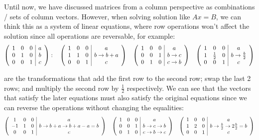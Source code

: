 \documentclass[11pt, cyan, night, 1in]{LatexTemplate/hw}
\begin{document}
Until now, we have discussed matrices from a column perspective as combinations / sets of column vectors. However, when solving solution like $Ax=B$, we can think this as a system of linear equations, where row operations won't affect the solution since all operations are reversable, for example: \[
    \left(\begin{array}{ccc|c}
        1 & 0 & 0  & a\\
        0 & 1 & 0  & b\\
        0 & 0 & 1 & c
    \end{array}\right):\quad\left(\begin{array}{ccc|c}
        1 & 0 & 0  & a\\
        1 & 1 & 0  & b \rightarrow b + a\\
        0 & 0 & 1 & c
    \end{array}\right) \quad \left(\begin{array}{ccc|c}
        1 & 0 & 0  & a\\
        0 & 0 & 1  & b \rightarrow c\\
        0 & 1 & 0 & c \rightarrow b
    \end{array}\right) \quad \left(\begin{array}{ccc|c}
        1 & 0 & 0  & a\\
        1 & \frac12 & 0  & b \rightarrow \frac{b}{2}\\
        0 & 0 & 1 & c
    \end{array}\right) 
    \]

are the transformations that add the first row to the second row; swap the last 2 rows; and multiply the second row by $\frac12$ respectively. We can see that the vectors that satisfy the later equations must also satisfy the original equations since we can reverse the operations without changing the equalities:\[
    \left(\begin{array}{ccc|c}
        1 & 0 & 0  & a\\
        -1 & 1 & 0  & b \rightarrow b + a \rightarrow b + a - a = b\\
        0 & 0 & 1 & c
    \end{array}\right) \quad \left(\begin{array}{ccc|c}
        1 & 0 & 0  & a\\
        0 & 0 & 1  & b \rightarrow c \rightarrow b\\
        0 & 1 & 0 & c \rightarrow b \rightarrow c
    \end{array}\right) \quad \left(\begin{array}{ccc|c}
        1 & 0 & 0  & a\\
        1 & 2 & 0  & b \rightarrow \frac{b}{2} \rightarrow 2\frac{b}{2} = b\\
        0 & 0 & 1 & c
    \end{array}\right) 
    \]
\end{document}
